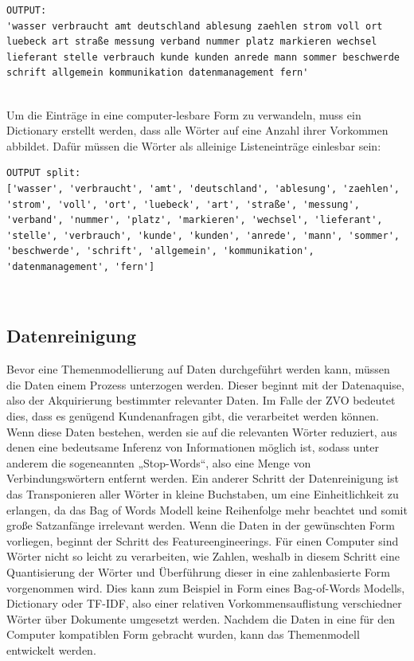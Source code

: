 \documentclass[german,version-2020-11]{uzl-thesis}
\begin{document}

\begin{lstlisting}
OUTPUT: 
'wasser verbraucht amt deutschland ablesung zaehlen strom voll ort luebeck art straße messung verband nummer platz markieren wechsel lieferant stelle verbrauch kunde kunden anrede mann sommer beschwerde schrift allgemein kommunikation datenmanagement fern'
\end{lstlisting}\\

Um die Einträge in eine computer-lesbare Form zu verwandeln, muss ein Dictionary erstellt werden, dass alle Wörter auf eine Anzahl ihrer Vorkommen abbildet. Dafür müssen die Wörter als alleinige Listeneinträge einlesbar sein: \\


\begin{lstlisting}
OUTPUT split: 
['wasser', 'verbraucht', 'amt', 'deutschland', 'ablesung', 'zaehlen', 'strom', 'voll', 'ort', 'luebeck', 'art', 'straße', 'messung', 'verband', 'nummer', 'platz', 'markieren', 'wechsel', 'lieferant', 'stelle', 'verbrauch', 'kunde', 'kunden', 'anrede', 'mann', 'sommer', 'beschwerde', 'schrift', 'allgemein', 'kommunikation', 'datenmanagement', 'fern']
\end{lstlisting}\\


\subsection{Datenreinigung}
Bevor eine Themenmodellierung auf Daten durchgeführt werden kann, müssen die Daten einem Prozess unterzogen werden. Dieser beginnt mit der Datenaquise, also der Akquirierung bestimmter relevanter Daten. Im Falle der ZVO bedeutet dies, dass es genügend Kundenanfragen gibt, die verarbeitet werden können. Wenn diese Daten bestehen, werden sie auf die relevanten Wörter reduziert, aus denen eine bedeutsame Inferenz von Informationen möglich ist, sodass unter anderem die sogeneannten „Stop-Words“, also eine Menge von Verbindungswörtern entfernt werden. Ein anderer Schritt der Datenreinigung ist das Transponieren aller Wörter in kleine Buchstaben, um eine Einheitlichkeit zu erlangen, da das Bag of Words Modell keine Reihenfolge mehr beachtet und somit große Satzanfänge irrelevant werden. Wenn die Daten in der gewünschten Form vorliegen, beginnt der Schritt des Featureengineerings. Für einen Computer sind Wörter nicht so leicht zu verarbeiten, wie Zahlen, weshalb in diesem Schritt eine Quantisierung der Wörter und Überführung dieser in eine zahlenbasierte Form vorgenommen wird. Dies kann zum Beispiel in Form eines Bag-of-Words Modells, Dictionary oder TF-IDF, also einer relativen Vorkommensauflistung verschiedner Wörter über Dokumente umgesetzt werden. Nachdem die Daten in eine für den Computer kompatiblen Form gebracht wurden, kann das Themenmodell entwickelt werden. 
\end{document}
